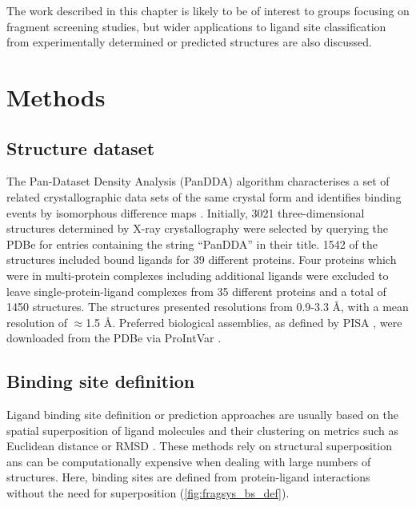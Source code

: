 The work described in this chapter is likely to be of interest to groups focusing on fragment screening studies, but wider applications to ligand site classification from experimentally determined or predicted structures are also discussed. 

\section{Methods}
\label{sec:ch_FRAGSYS_methods}

\subsection{Structure dataset}

The Pan-Dataset Density Analysis (PanDDA) algorithm characterises a set of related crystallographic data sets of the same crystal form and identifies binding events by isomorphous difference maps \cite{PEARCE_2017_PANDDA}. Initially, 3021 three-dimensional structures determined by X-ray crystallography were selected by querying the PDBe \cite{wwPDB_2019_PDB} for entries containing the string ``PanDDA'' in their title. 1542 of the structures included bound ligands for 39 different proteins. Four proteins which were in multi-protein complexes including additional ligands were excluded to leave single-protein-ligand complexes from 35 different proteins and a total of 1450 structures. The structures presented resolutions from 0.9-3.3 \AA{}, with a mean resolution of $\approx$1.5 \AA{}. Preferred biological assemblies, as defined by PISA \cite{KRISSINEL_2007_PISA}, were downloaded from the PDBe via ProIntVar \cite{MACGOWAN_2020_DRSASP}. 

\subsection{Binding site definition}

Ligand binding site definition or prediction approaches are usually based on the spatial superposition of ligand molecules and their clustering on metrics such as Euclidean distance or RMSD \cite{SHIN_2005_PDBLIGAND, KOZAKOV_2005_CLUSTERING, WASS_2010_3DLIGANDSITE, MCGREIG_2022_3DLIGANDSITE}. These methods rely on structural superposition ans can be computationally expensive when dealing with large numbers of structures. Here, binding sites are defined from protein-ligand interactions without the need for superposition (\autoref{fig:fragsys_bs_def}).

